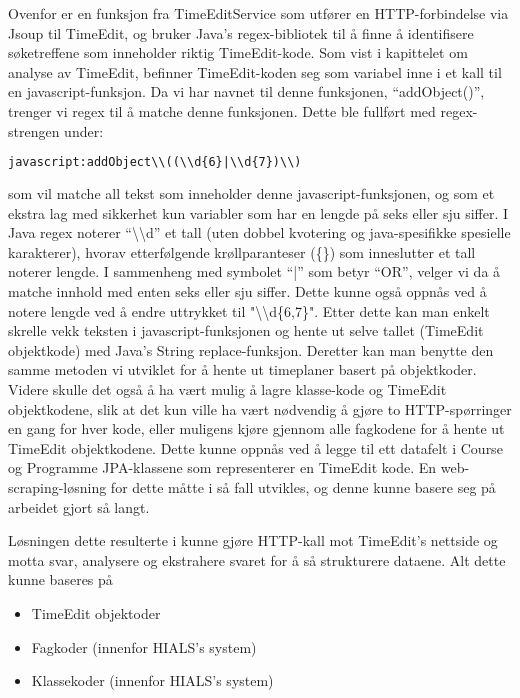\documentclass[../main.tex]{subfiles}
\begin{document}
Ovenfor er en funksjon fra TimeEditService som utfører en HTTP-forbindelse via Jsoup til TimeEdit, og bruker Java’s regex-bibliotek til å finne å identifisere søketreffene som inneholder riktig TimeEdit-kode. Som vist i kapittelet om analyse av TimeEdit, befinner TimeEdit-koden seg som variabel inne i et kall til en javascript-funksjon. Da vi har navnet til denne funksjonen, “addObject()”, trenger vi regex til å matche denne funksjonen. Dette ble fullført med regex-strengen under:

\begin{lstlisting}[language=HTML, frame=single, caption={Utdrag fra kildekoden i figur \ref{fig:timeeditc}}]
javascript:addObject\\((\\d{6}|\\d{7})\\)
\end{lstlisting}

som vil matche all tekst som inneholder denne javascript-funksjonen, og som et ekstra lag med sikkerhet kun variabler som har en lengde på seks eller sju siffer. I Java regex noterer “\textbackslash \textbackslash d” et tall (uten dobbel kvotering og java-spesifikke spesielle karakterer), hvorav etterfølgende krøllparanteser (\{\}) som inneslutter et tall noterer lengde. I sammenheng med symbolet “|” som betyr “OR”, velger vi da å matche innhold med enten seks eller sju siffer. Dette kunne også oppnås ved å notere lengde ved å endre uttrykket til "\textbackslash \textbackslash d\{6,7\}". \newline
Etter dette kan man enkelt skrelle vekk teksten i javascript-funksjonen og hente ut selve tallet (TimeEdit objektkode) med Java’s String replace-funksjon.
Deretter kan man benytte den samme metoden vi utviklet for å hente ut timeplaner basert på objektkoder. Videre skulle det også å ha vært mulig å lagre klasse-kode og TimeEdit objektkodene, slik at det kun ville ha vært nødvendig å gjøre to HTTP-spørringer en gang for hver kode, eller muligens kjøre gjennom alle fagkodene for å hente ut TimeEdit objektkodene. Dette kunne oppnås ved å legge til ett datafelt i Course og Programme JPA-klassene som representerer en TimeEdit kode. En web-scraping-løsning for dette måtte i så fall utvikles, og denne kunne basere seg på arbeidet gjort så langt.\newline

Løsningen dette resulterte i kunne gjøre HTTP-kall mot TimeEdit's nettside og motta svar, analysere og ekstrahere svaret for å så strukturere dataene. Alt dette kunne baseres på 
\begin{itemize}
\item TimeEdit objektoder
\item Fagkoder (innenfor HIALS's system)
\item Klassekoder (innenfor HIALS's system)
\end{itemize}
\end{document}
